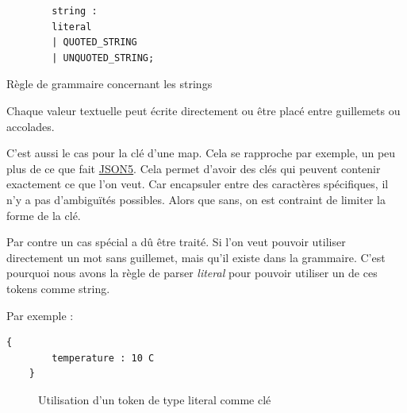 \documentclass[
    iict, %
    il, %
]{heig-tb}
\begin{document}
\begin{listing}[!ht]
    \begin{verbatim}
        string :
        literal
        | QUOTED_STRING
        | UNQUOTED_STRING;
    \end{verbatim}
    \caption{Règle de grammaire concernant les strings}
    \label{string-rule}
\end{listing}

Chaque valeur textuelle peut écrite directement ou être placé entre guillemets ou accolades.

C'est aussi le cas pour la clé d'une map.
Cela se rapproche par exemple, un peu plus de ce que fait \href{https://json5.org/}{JSON5}.
Cela permet d'avoir des clés qui peuvent contenir exactement ce que l'on veut.
Car encapsuler entre des caractères spécifiques, il n'y a pas d'ambiguïtés possibles. Alors que sans, on est contraint de limiter la forme de la clé.

Par contre un cas spécial a dû être traité. Si l'on veut pouvoir utiliser directement un mot sans guillemet, mais qu'il existe dans la grammaire.
C'est pourquoi nous avons la règle de parser \emph{literal} pour pouvoir utiliser un de ces tokens comme string.

Par exemple :

\begin{lstlisting}[frame=single]
    {
        temperature : 10 C
    }
\end{lstlisting}

\begin{figure}[!h]
    \begin{center}
    \end{center}
    \caption[Utilisation d'un token de type literal comme clé]{\label{literal-key-uon}Utilisation d'un token de type literal comme clé}
\end{figure}
\end{document}
